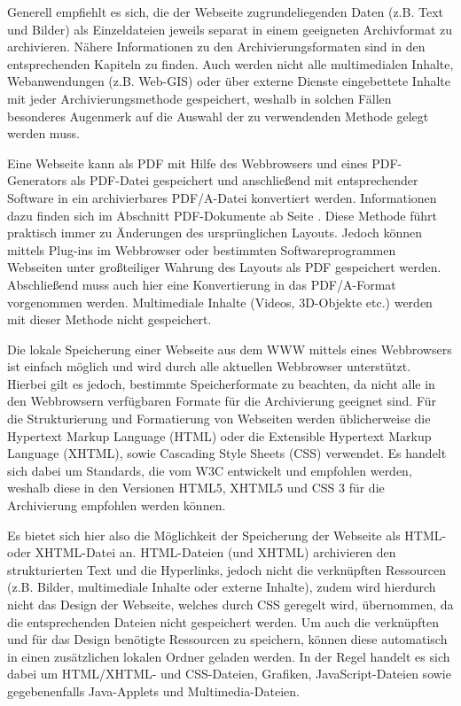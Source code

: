 Generell empfiehlt es sich, die der Webseite zugrundeliegenden Daten (z.B. Text und Bilder) als Einzeldateien jeweils separat in einem geeigneten Archivformat zu archivieren. Nähere Informationen zu den Archivierungsformaten sind in den entsprechenden Kapiteln zu finden. Auch werden nicht alle multimedialen Inhalte, Webanwendungen (z.B. Web-GIS) oder über externe Dienste eingebettete Inhalte mit jeder Archivierungsmethode gespeichert, weshalb in solchen Fällen besonderes Augenmerk auf die Auswahl der zu verwendenden Methode gelegt werden muss.

Eine Webseite kann als PDF mit Hilfe des Webbrowsers und eines PDF-Generators als PDF-Datei gespeichert und anschließend mit entsprechender Software in ein archivierbares PDF/A-Datei konvertiert werden. Informationen dazu finden sich im Abschnitt PDF-Dokumente ab Seite \pageref{pdf-dokumente}. Diese Methode führt praktisch immer zu Änderungen des ursprünglichen Layouts. Jedoch können mittels Plug-ins im Webbrowser oder bestimmten Softwareprogrammen Webseiten unter großteiliger Wahrung des Layouts als PDF gespeichert werden. Abschließend muss auch hier eine Konvertierung in das PDF/A-Format vorgenommen werden. Multimediale Inhalte (Videos, 3D-Objekte etc.) werden mit dieser Methode nicht gespeichert.

Die lokale Speicherung einer Webseite aus dem WWW mittels eines Webbrowsers ist einfach möglich und wird durch alle aktuellen Webbrowser unterstützt. Hierbei gilt es jedoch, bestimmte Speicherformate zu beachten, da nicht alle in den Webbrowsern verfügbaren Formate für die Archivierung geeignet sind. Für die Strukturierung und Formatierung von Webseiten werden üblicherweise die Hypertext Markup Language (HTML) oder die  Extensible Hypertext Markup Language (XHTML), sowie Cascading Style Sheets (CSS) verwendet. Es handelt sich dabei um Standards, die vom W3C entwickelt und empfohlen werden, weshalb diese in den Versionen HTML5, XHTML5 und CSS 3 für die Archivierung empfohlen werden können.

Es bietet sich hier also die Möglichkeit der Speicherung der Webseite als HTML- oder XHTML-Datei an. HTML-Dateien (und XHTML) archivieren den strukturierten Text und die Hyperlinks, jedoch nicht die verknüpften Ressourcen (z.B. Bilder, multimediale Inhalte oder externe Inhalte), zudem wird hierdurch nicht das Design der Webseite, welches durch CSS geregelt wird, übernommen, da die entsprechenden Dateien nicht gespeichert werden. Um auch die verknüpften und für das Design benötigte Ressourcen zu speichern, können diese automatisch in einen zusätzlichen lokalen Ordner geladen werden. In der Regel handelt es sich dabei um HTML/XHTML- und CSS-Dateien, Grafiken, JavaScript-Dateien sowie gegebenenfalls Java-Applets und Multimedia-Dateien. 

